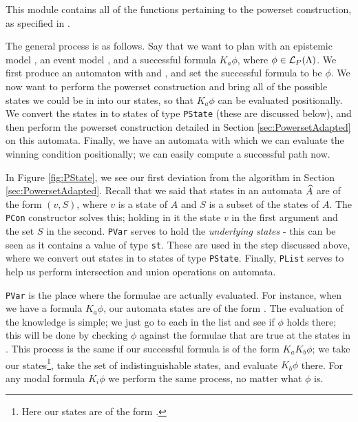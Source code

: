 \documentclass[10pt, a4paper]{report}
\begin{document}
This module contains all of the functions pertaining to the powerset
construction, as specified in .

The general process is as follows. Say that we want to plan with an epistemic
model , an event model , and a successful formula $K_a \phi$,
where $\phi \in \mathcal{L}_P(\Lambda)$. We first produce an \mestar automaton
with  and , and set the successful formula to be $\phi$. We now
want to perform the powerset construction and bring all of the possible states
we could be in into our states, so that $K_a \phi$ can be evaluated
positionally. We convert the states in \mestar to states of type
\texttt{PState} (these are discussed below), and then perform the
powerset construction detailed in Section \ref{sec:PowersetAdapted} on this
automata. Finally, we have an automata with which we can evaluate the winning
condition positionally; we can easily compute a successful path now. 

In Figure \ref{fig:PState}, we see our first deviation from the algorithm in
Section \ref{sec:PowersetAdapted}. Recall that we said that states in an
automata $\widehat{A}$ are of the form $(v, S)$, where $v$ is a state of $A$ and $S$
is a subset of the states of $A$. The \texttt{PCon} constructor
solves this; holding in it the state $v$ in the first argument and the set $S$
in the second. \texttt{PVar} serves to hold the \emph{underlying
  states} - this can be seen as it contains a value of type
\texttt{st}. These are used in the step discussed above, where we
convert out states in \mestar to states of type \texttt{PState}.
Finally, \texttt{PList} serves to help us perform intersection and
union operations on automata.

\texttt{PVar} is the place where the formulae are actually
evaluated. For instance, when we have a formula $K_a \phi$, our automata states
are of the form . The evaluation of the knowledge
is simple; we just go to each  in the list and see if $\phi$ holds
there; this will be done by checking $\phi$ against the formulae that are true
at the states in . This process is the same if our successful formula
is of the form $K_a K_b \phi$; we take our states\footnote{Here our states are
  of the form .}, take the set of indistinguishable states, and evaluate $K_b \phi$
there. For any modal formula $K_i \phi$ we perform the same process, no matter
what $\phi$ is.
\end{document}
